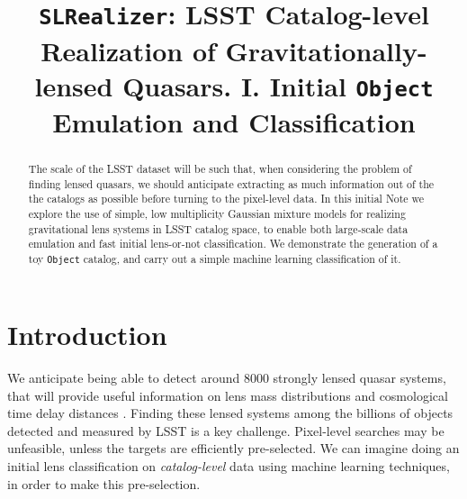 \documentclass[\docopts]{\docclass}
\def\SLRealizer{\texttt{SLRealizer}\xspace}
\def\Object{\texttt{Object}\xspace}
\begin{document}
\title{\SLRealizer: LSST Catalog-level Realization of Gravitationally-lensed Quasars. I. Initial \Object Emulation and Classification}

\maketitlepre

\begin{abstract}

The scale of the LSST dataset will be such that, when considering the
problem of finding lensed quasars, we should anticipate extracting as
much information out of the the catalogs as possible before turning to
the pixel-level data. In this initial Note we explore the use of simple, low
multiplicity Gaussian mixture models for realizing gravitational lens
systems in LSST catalog space, to enable both large-scale data
emulation and fast initial lens-or-not classification. We demonstrate
the generation of a toy \Object catalog, and carry out a
simple machine learning classification of it.

\end{abstract}


\maketitlepost


\section{Introduction}
\label{sec:intro}


We anticipate being able to detect around 8000 strongly lensed quasar
systems, that will provide useful information on lens mass distributions
and cosmological time delay distances \citep{TM16,Twinkles}.
Finding these lensed systems among the billions of objects detected and
measured by LSST \citep{LSSTScienceBookv2} is a key challenge.
Pixel-level searches \citep[e.g.\ ]{RINGFINDER} may be unfeasible,
unless the targets are efficiently pre-selected.  We can imagine doing
an initial lens classification on {\it catalog-level} data using machine
learning techniques, in order to make this pre-selection.
\end{document}
